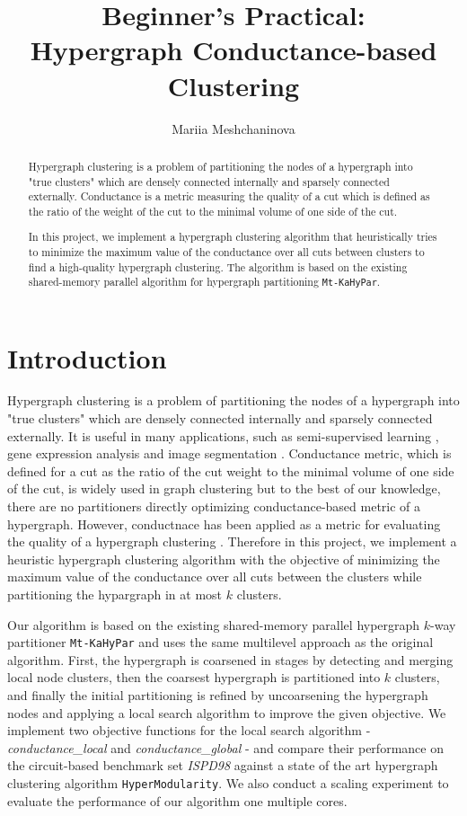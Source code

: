 \documentclass[acmsmall,nonacm,screen,review]{acmart}
\title{Beginner's Practical: \\ Hypergraph Conductance-based Clustering}
\author{Mariia Meshchaninova}
\affiliation{%
  \institution{Heidelberg University}
  \streetaddress{Im Neuenheimer Feld 205}
  \city{Heidelberg}
  \state{Baden-Württemberg}
  \country{Germany}
  \postcode{69120}
}
\date{}
\begin{document}
\begin{abstract}
Hypergraph clustering is a problem of partitioning the nodes of a 
hypergraph into "true clusters" which are densely connected internally 
and sparsely connected externally. Conductance is a metric measuring 
the quality of a cut which is defined as the ratio of the weight of 
the cut to the minimal volume of one side of the cut.

In this project, we implement a hypergraph clustering algorithm that
heuristically tries to minimize the maximum value of the conductance 
over all cuts between clusters to find a high-quality hypergraph 
clustering. The algorithm is based on the existing shared-memory 
parallel algorithm for hypergraph partitioning \texttt{Mt-KaHyPar}.
\end{abstract}
\maketitle

\section{Introduction}
Hypergraph clustering is a problem of partitioning the nodes of a 
hypergraph into "true clusters" which are densely connected internally 
and sparsely connected externally. It is useful in many applications, 
such as semi-supervised learning \cite{ApplicationLearning}, 
gene expression analysis \cite{ApplicationGeneExpression}
and image segmentation \cite{ApplicationImageSegmentation}. 
Conductance metric, which is defined for a cut as the ratio of the cut 
weight to the minimal volume of one side of the cut, is widely used in 
graph clustering \cite{PCde, GraphConductance2006} but to the best
of our knowledge, there are no partitioners directly optimizing
conductance-based metric of a hypergraph. However, conductnace has been 
applied as a metric for evaluating the quality of a hypergraph 
clustering \cite{HyperSF}. Therefore in this project, we implement a 
heuristic hypergraph clustering algorithm with the objective of 
minimizing the maximum value of the conductance over all cuts between 
the clusters while partitioning the hypargraph in at most $k$ clusters. 

\noindent Our algorithm is based on the existing shared-memory parallel 
hypergraph $k$-way partitioner \texttt{Mt-KaHyPar} and uses the same 
multilevel approach as the original algorithm. First, the hypergraph is 
coarsened in stages by detecting and merging local node clusters, then 
the coarsest hypergraph is partitioned into $k$ clusters, and finally 
the initial partitioning is refined by uncoarsening the hypergraph 
nodes and applying a local search algorithm to improve the given 
objective. We implement two objective functions for the local search 
algorithm - \textit{conductance\_local} and 
\textit{conductance\_global} - and compare their performance on the
circuit-based benchmark set \textit{ISPD98} \cite{IBMBenchmark} against 
a state of the art hypergraph clustering algorithm 
\texttt{HyperModularity}. We also conduct a scaling experiment to 
evaluate the performance of our algorithm one multiple cores.
\end{document}
